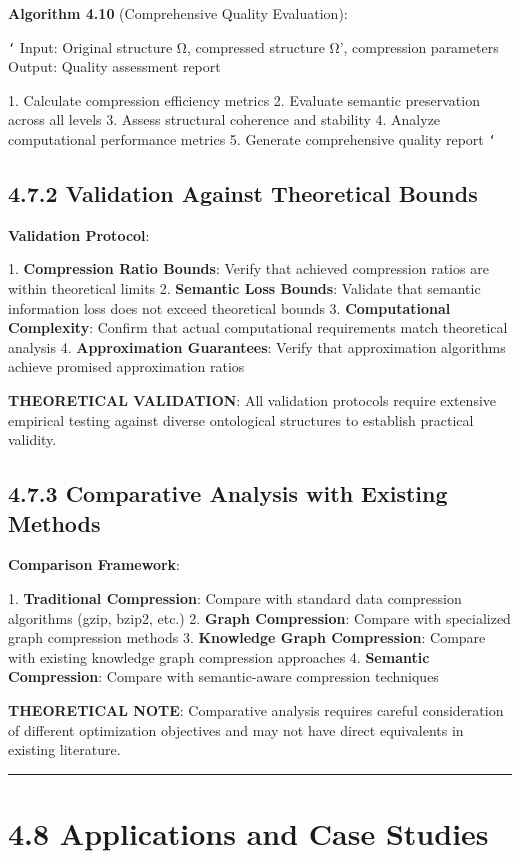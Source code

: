 \textbf{Algorithm 4.10} (Comprehensive Quality Evaluation):

\texttt{`}
Input: Original structure Ω, compressed structure Ω', compression parameters
Output: Quality assessment report

1. Calculate compression efficiency metrics
2. Evaluate semantic preservation across all levels
3. Assess structural coherence and stability
4. Analyze computational performance metrics
5. Generate comprehensive quality report
\texttt{`}

\subsection{4.7.2 Validation Against Theoretical Bounds}

\textbf{Validation Protocol}:

1. \textbf{Compression Ratio Bounds}: Verify that achieved compression ratios are within theoretical limits
2. \textbf{Semantic Loss Bounds}: Validate that semantic information loss does not exceed theoretical bounds
3. \textbf{Computational Complexity}: Confirm that actual computational requirements match theoretical analysis
4. \textbf{Approximation Guarantees}: Verify that approximation algorithms achieve promised approximation ratios

\textbf{THEORETICAL VALIDATION}: All validation protocols require extensive empirical testing against diverse ontological structures to establish practical validity.

\subsection{4.7.3 Comparative Analysis with Existing Methods}

\textbf{Comparison Framework}:

1. \textbf{Traditional Compression}: Compare with standard data compression algorithms (gzip, bzip2, etc.)
2. \textbf{Graph Compression}: Compare with specialized graph compression methods
3. \textbf{Knowledge Graph Compression}: Compare with existing knowledge graph compression approaches
4. \textbf{Semantic Compression}: Compare with semantic-aware compression techniques

\textbf{THEORETICAL NOTE}: Comparative analysis requires careful consideration of different optimization objectives and may not have direct equivalents in existing literature.

\hrule

\section{4.8 Applications and Case Studies}


